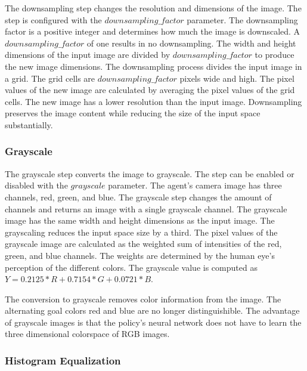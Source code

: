 The downsampling step changes the resolution and dimensions of the image. The step is configured with the $downsampling\_factor$ parameter. The downsampling factor is a positive integer and determines how much the image is downscaled. A $downsampling\_factor$ of one results in no downsampling. The width and height dimensions of the input image are divided by $downsampling\_factor$ to produce the new image dimensions.
The downsampling process divides the input image in a grid. The grid cells are $downsampling\_factor$ pixels wide and high. The pixel values of the new image are calculated by averaging the pixel values of the grid cells. The new image has a lower resolution than the input image.
Downsampling preserves the image content while reducing the size of the input space substantially.



\subsubsection{Grayscale}

The grayscale step converts the image to grayscale. The step can be enabled or disabled with the $grayscale$ parameter. The agent's camera image has three channels, red, green, and blue. The grayscale step changes the amount of channels and returns an image with a single grayscale channel. The grayscale image has the same width and height dimensions as the input image. The grayscaling reduces the input space size by a third.
The pixel values of the grayscale image are calculated as the weighted sum of intensities of the red, green, and blue channels. The weights are determined by the human eye's perception of the different colors. The grayscale value is computed as $Y = 0.2125 * R + 0.7154 * G + 0.0721 * B$.

The conversion to grayscale removes color information from the image. The alternating goal colors red and blue are no longer distinguishible. The advantage of grayscale images is that the policy's neural network does not have to learn the three dimensional colorspace of RGB images.



\subsubsection{Histogram Equalization}
\label{sec:histogram_equalization}

